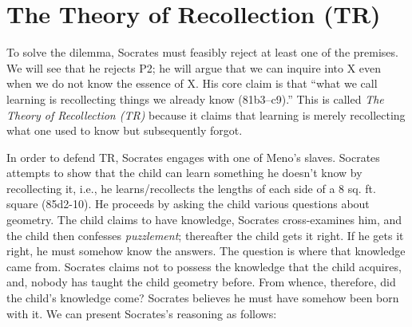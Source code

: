 \documentclass[10 pt]{article}
\begin{document}
\section*{The Theory of Recollection (TR)}
To solve the dilemma, Socrates must feasibly reject at least one of the premises. We will see that he rejects P2; he will argue that we can inquire into X even when we do not know the essence of X. His core claim is that ``what we call learning is recollecting things we already know (81b3--c9).'' This is called \emph{The Theory of Recollection (TR)} because it claims that learning is merely recollecting what one used to know but subsequently forgot. 

In order to defend TR, Socrates engages with one of Meno's slaves. Socrates attempts to show that the child can learn something he doesn't know by recollecting it, i.e., he learns/recollects the lengths of each side of a 8 sq. ft. square (85d2-10).  He proceeds by asking the child various questions about geometry. The child claims to have knowledge, Socrates cross-examines him, and the child then confesses \emph{puzzlement}; thereafter the child gets it right. If he gets it right, he must somehow know the answers. The question is where that knowledge came from.  Socrates claims not to possess the knowledge that the child acquires, and, nobody has taught the child geometry before. From whence, therefore, did the child's knowledge come? Socrates believes he must have somehow been born with it. We can present Socrates's reasoning as follows: 

\end{document}
